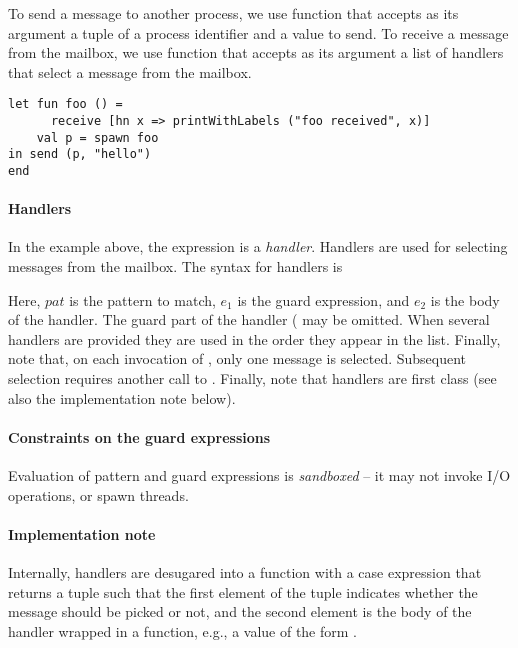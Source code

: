 To send a message to another process, we use function  that accepts as its argument a tuple of
a process identifier and a value to send. To receive a message from the mailbox, we use function 
that accepts as its argument a list of handlers that select a message from the mailbox.



\begin{lstlisting}
let fun foo () =
      receive [hn x => printWithLabels ("foo received", x)]
    val p = spawn foo
in send (p, "hello")
end    
\end{lstlisting}


\paragraph{Handlers}\label{sec:handlers} 
In the example above, the expression  is a \emph{handler}. 
Handlers are used for selecting messages from the mailbox. The syntax for handlers is
\begin{center}
 \end{center}
 
 Here, $\mathit{pat}$ is the pattern to match, $\mathit{e_1}$ is the guard expression, and $\mathit{e_2}$ is the body of the handler. 
 The guard part of the handler ( may be omitted. 
 When several handlers are provided they are used in the order they appear in the list.
Finally, note that, on each invocation of , only one message is selected. Subsequent selection
requires another call to .
Finally, note that handlers are first class (see also the implementation note below).  

\paragraph{Constraints on the guard expressions}
Evaluation of pattern and guard expressions is \emph{sandboxed} -- it may not invoke I/O operations, or 
spawn threads.


\paragraph{Implementation note} 
Internally, handlers are desugared into a function with a case expression that returns a tuple such that the first 
element of the tuple indicates whether the message should be picked or not, and the second element is the body 
of the handler wrapped in a function, e.g., a value of the form .
\fi 

